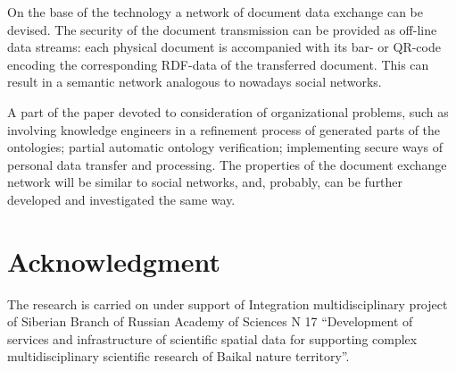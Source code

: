 \documentclass[conference]{IEEEtran}
\begin{document}
{{On the base of the technology a network of document data exchange can be devised. The security of the document transmission can be provided as off-line data streams: each physical document is accompanied with its bar- or QR-code encoding the corresponding RDF-data of the transferred document. This can result in a semantic network analogous to nowadays social networks.

A part of the paper devoted to consideration of organizational problems, such as involving knowledge engineers in a refinement process of generated parts of the ontologies; partial automatic ontology verification; implementing secure ways of personal data transfer and processing. The properties of the document exchange network will be similar to social networks, and, probably, can be further developed and investigated the same way.





\section*{Acknowledgment}
The research is carried on under support of Integration multidisciplinary project of Siberian Branch of Russian Academy of Sciences N 17 “Development of services and infrastructure of scientific spatial data for supporting complex multidisciplinary scientific research of Baikal nature territory”.








%
%
%
\begin{thebibliography}{11}


\end{thebibliography}}}
\end{document}

